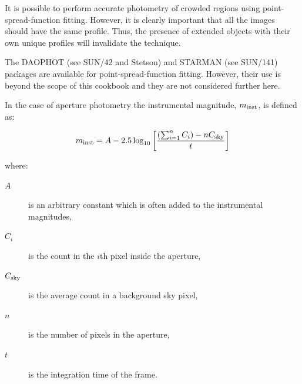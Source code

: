 \documentclass[twoside,11pt]{article}
\newcommand{\xref}[3]{#1}
\begin{document}
\begin{description}
   It is possible to perform accurate photometry of crowded regions
   using point-spread-function fitting.  However, it is clearly
   important that all the images should have the same profile.  Thus,
   the presence of extended objects with their own unique profiles
   will invalidate the technique.

   The DAOPHOT (see \xref{SUN/42}{sun42}{}\cite{SUN42} and
   Stetson\cite{STETSON87}) and STARMAN (see SUN/141\cite{SUN141}) 
   packages are available for
   point-spread-function fitting.  However, their use is beyond the scope
   of this cookbook and they are not considered further here.
  
\end{description}

In the case of aperture photometry the instrumental magnitude, 
$m_{\rm inst}$, is defined as:

\begin{equation}
m_{\rm inst} = A - 2.5 \log_{10} \left[
       \frac{( \sum_{i=1}^{n} C_{i} )  - n C_{\rm sky} }{t}
       \right]  \label{INSTREQN}
\end{equation}

where:

\begin{description}

  \item[$A$] is an arbitrary constant which is often added to the
   instrumental magnitudes,

  \item[$C_{i}$] is the count in the $i$th pixel inside the aperture,

  \item[$C_{\rm sky}$] is the average count in a background sky pixel,

  \item[$n$] is the number of pixels in the aperture,

  \item[$t$] is the integration time of the frame.

\end{description}
\end{document}

